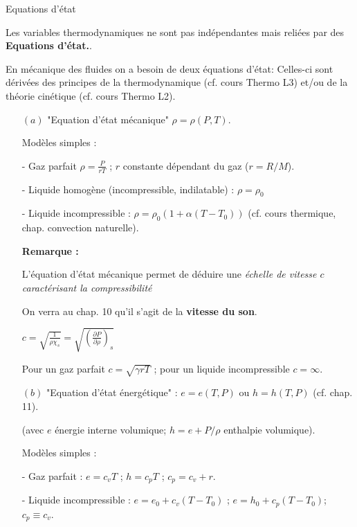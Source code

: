 \begin{frame}{Equations d'état}

\small 

Les variables thermodynamiques ne sont pas indépendantes mais reliées par des {\bf Equations d'état.}.

En mécanique des fluides on a besoin de deux équations d'état:
Celles-ci sont dérivées des principes de la thermodynamique (cf. cours Thermo L3) et/ou
de la théorie cinétique (cf. cours Thermo L2).
 
\begin{itemize}
\item[$(a)$]  "Equation d'état mécanique"  $\rho = \rho(P,T)$.

\pause
Modèles simples :

 - Gaz parfait $\rho = \frac{P}{r T}$ ; \qquad $r$ constante dépendant du gaz ($r=R/M$). 

- Liquide homogène (incompressible, indilatable) :  $\rho = \rho_0 $
 
{\color{gris} - Liquide incompressible : $\rho = \rho_0 (1+\alpha (T-T_0))$ 
(cf. cours thermique, chap. convection naturelle).}

\pause

{\bf Remarque :} 

L'équation d'état mécanique permet de déduire une {\em échelle de vitesse $c$ caractérisant la compressibilité} 

On verra au chap. 10 qu'il s'agit de la {\bf vitesse du son}. 

$c = \sqrt{\frac{1}{\rho \chi_s}} = \sqrt{ \left( \frac{\partial P}{\partial \rho} \right)_s }$

Pour un gaz parfait $c = \sqrt{\gamma r T}$ ; pour un liquide incompressible $c = \infty$.



\pause
\medskip

\item[$(b)$] "Equation d'état énergétique" : $e = e(T,P)$ ou $h = h(T,P)$ (cf. chap. 11).

(avec $e$ énergie interne volumique; $h = e+P/\rho$  enthalpie volumique).
\pause

Modèles simples :

- Gaz parfait : $e = c_v T$  ; $h = c_p T $ ; $c_p = c_v + r$.

- Liquide incompressible :  $e = e_0 + c_v (T-T_0)$ ; $e = h_0 + c_p (T-T_0)$; $c_p \equiv c_v$.



 



\end{itemize}




\end{frame}



